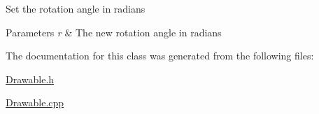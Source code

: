 Set the rotation angle in radians 
\begin{DoxyParams}{Parameters}
{\em r} & The new rotation angle in radians \\
\hline
\end{DoxyParams}


The documentation for this class was generated from the following files\+:\begin{DoxyCompactItemize}
\item 
\hyperlink{_drawable_8h}{Drawable.\+h}\item 
\hyperlink{_drawable_8cpp}{Drawable.\+cpp}\end{DoxyCompactItemize}

